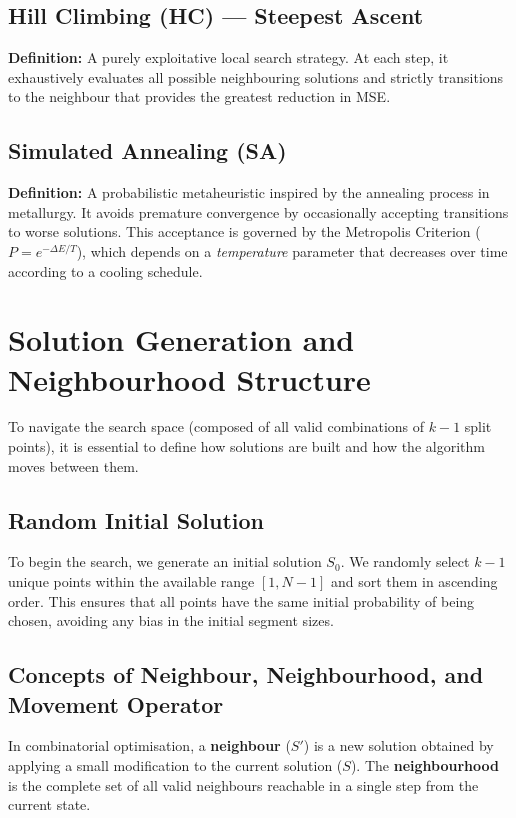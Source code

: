 \documentclass[12pt, a4paper]{article}
\begin{document}
\subsection{Hill Climbing (HC) --- Steepest Ascent}
\textbf{Definition:} A purely exploitative local search strategy. At each step, it
exhaustively evaluates all possible neighbouring solutions and strictly transitions to
the neighbour that provides the greatest reduction in MSE.

\subsection{Simulated Annealing (SA)}
\textbf{Definition:} A probabilistic metaheuristic inspired by the annealing process
in metallurgy. It avoids premature convergence by occasionally accepting transitions to
worse solutions. This acceptance is governed by the Metropolis Criterion
($P = e^{-\Delta E/T}$), which depends on a \emph{temperature} parameter that
decreases over time according to a cooling schedule.

\section{Solution Generation and Neighbourhood Structure}

To navigate the search space (composed of all valid combinations of $k-1$ split
points), it is essential to define how solutions are built and how the algorithm moves
between them.

\subsection{Random Initial Solution}
To begin the search, we generate an initial solution $S_0$. We randomly select $k-1$
unique points within the available range $[1, N-1]$ and sort them in ascending order.
This ensures that all points have the same initial probability of being chosen, avoiding
any bias in the initial segment sizes.

\subsection{Concepts of Neighbour, Neighbourhood, and Movement Operator}
In combinatorial optimisation, a \textbf{neighbour} ($S'$) is a new solution obtained
by applying a small modification to the current solution ($S$). The
\textbf{neighbourhood} is the complete set of all valid neighbours reachable in a
single step from the current state.
\end{document}
